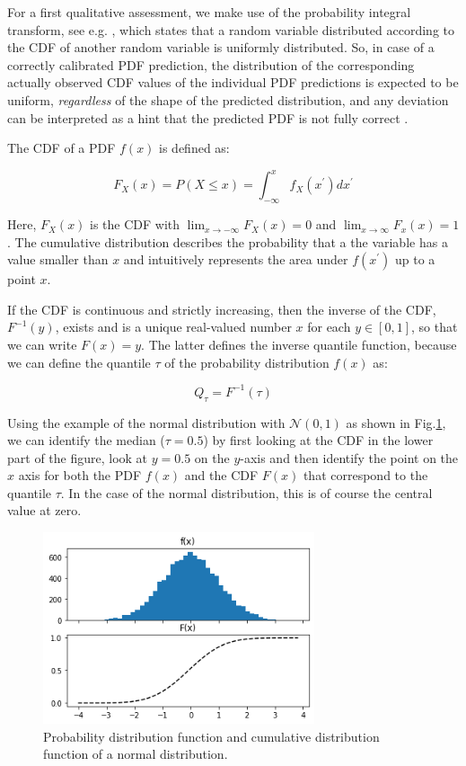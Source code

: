 \documentclass[BCOR=1mm, DIV=calc,10pt,
twoside=true,
twocolumn,
headings=normal]{scrartcl}
\newcommand{\fig}{Fig.}
\begin{document}
For a first qualitative assessment, we make use of the probability integral transform, see e.g. \cite{Angus1994,casella2002statistical}, which states that a random variable distributed according to the CDF of another random variable is uniformly distributed. So, in case of a correctly calibrated PDF prediction, the distribution of the corresponding actually observed CDF values of the individual PDF predictions is expected to be uniform, {\em regardless} of the shape of the predicted distribution, and any deviation can be interpreted as a hint that the predicted PDF is not fully correct \cite{diebold1998vevaluating}.

The CDF of a PDF $f(x)$ is defined as:

\begin{equation}
\label{eqn:CDF}
F_X(x) = P(X \le x) = \int_{-\infty}^{x} f_X(x^\prime) dx^\prime
\end{equation}

Here, $F_X(x)$ is the CDF with $\lim_{x \to -\infty}F_X(x) = 0$ and $\lim_{x \to \infty}F_x(x) = 1$. The cumulative distribution describes the probability that a the variable has a value smaller than $x$ and intuitively represents the area under $f(x^\prime)$ up to a point $x$.

If the CDF is continuous and strictly increasing, then the inverse of the CDF, $F^{-1}(y)$, exists and is a unique real-valued number $x$ for each $y \in [0,1]$, so that we can write $F(x) = y$. The latter defines the inverse quantile function, because we can define the quantile $\tau$ of the probability distribution $f(x)$ as:

\begin{equation}
Q_\tau = F^{-1}(\tau)
\end{equation}

Using the example of the normal distribution with $\mathcal{N}(0,1)$ as shown in \fig \ref{fig:PdfCdf}, we can identify the median ($\tau = 0.5$) by first looking at the CDF in the lower part of the figure, look at $y=0.5$ on the $y$-axis and then identify the point on the $x$ axis for both the PDF $f(x)$ and the CDF $F(x)$ that correspond to the quantile $\tau$. In the case of the normal distribution, this is of course the central value at zero.

\begin{figure}
\begin{center}
\includegraphics[width=8cm]{../figures/PdfCdf}
\caption{\label{fig:PdfCdf} Probability distribution function and cumulative distribution function of a normal distribution.}
\end{center}
\end{figure}
\end{document}
